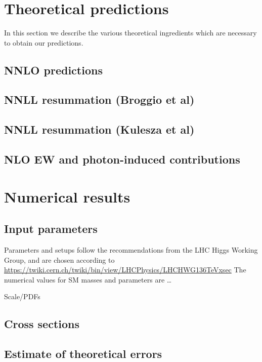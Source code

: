 \documentclass[a4paper,usenames,dvipsnames,11pt]{article}
\begin{document}
\section{Theoretical predictions}
\label{sec:theo}
In this section we describe the various theoretical ingredients which are necessary to obtain our predictions.

\subsection{NNLO predictions}
\label{sec:theo-nnlo}

\subsection{NNLL resummation (Broggio et al)}
\label{sec:theo-nnllb}

\subsection{NNLL resummation (Kulesza et al)}
\label{sec:theo-nnllk}

\subsection{NLO EW and photon-induced contributions}
\label{sec:theo-ew}

\section{Numerical results}
\label{sec:results}

\subsection{Input parameters}
\label{sec:results-input}
Parameters and setups follow the recommendations from the LHC Higgs Working Group, and are chosen according to
\url{https://twiki.cern.ch/twiki/bin/view/LHCPhysics/LHCHWG136TeVxsec}
The numerical values for SM masses and parameters are \ldots

Scale/PDFs

\subsection{Cross sections}
\label{sec:results-xsects}

\subsection{Estimate of theoretical errors}
\label{sec:results-therr}
\end{document}
